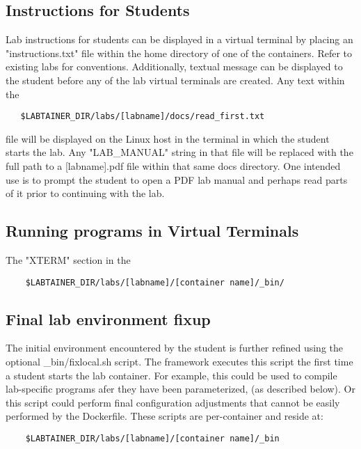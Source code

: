 \documentclass[12pt]{article}
\begin{document}
\subsection {Instructions for Students}
Lab instructions for students can be displayed in a virtual terminal by placing an
"instructions.txt" file within the home directory of one of the containers.  Refer to existing
labs for conventions.  Additionally, textual message can be displayed to the student before any 
of the lab virtual terminals are created.  Any text within the 
\begin{verbatim}
   $LABTAINER_DIR/labs/[labname]/docs/read_first.txt
\end{verbatim}
\noindent file will be displayed on the Linux host in the terminal in which the student
starts the lab.  Any "LAB\_MANUAL" string in that file will be replaced with the full path
to a [labname].pdf file within that same docs directory.  One intended use is to prompt the
student to open a PDF lab manual and perhaps read parts of it prior to continuing with the lab.

\subsection {Running programs in Virtual Terminals}
The "XTERM" section in the 
\begin{verbatim}
    $LABTAINER_DIR/labs/[labname]/[container name]/_bin/
\end{verbatim}

\subsection{Final lab environment fixup}
The initial environment encountered by the student is further refined using
the optional \_bin/fixlocal.sh script.  The framework executes
this script the first time a student starts the lab container.  For example,
this could be used to compile lab-specific programs afer they have been parameterized,
(as described below).  Or this script could perform final configuration adjustments
that cannot be easily performed by the Dockerfile.  These scripts are per-container
and reside at:
\begin{verbatim}
    $LABTAINER_DIR/labs/[labname]/[container name]/_bin
\end{verbatim}
\end{document}
